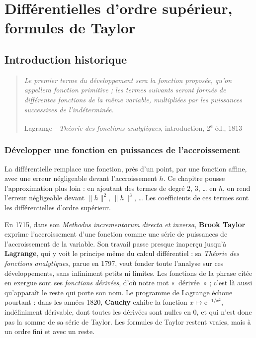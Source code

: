 \documentclass[a4paper,twoside]{report}
\newcommand{\ee}{\mathrm{e}}                      %
\newcommand{\norme}[1]{\lVert #1 \rVert}         %
\begin{document}
\setcounter{chapter}{3}

\chapter[Ordre supérieur, Taylor]{Différentielles d'ordre supérieur, formules de Taylor}

\section{Introduction historique}

\begin{quote}
\emph{Le premier terme du développement sera la fonction proposée, qu'on appellera fonction primitive ; les termes suivants seront formés de différentes fonctions de la même variable, multipliées par les puissances successives de l'indéterminée.}
\begin{flushright}Lagrange - \emph{Théorie des fonctions analytiques}, introduction, 2\textsuperscript{e} éd., 1813\end{flushright}
\end{quote}

\subsection{Développer une fonction en puissances de l'accroissement}

La différentielle remplace une fonction, près d'un point, par une fonction affine, avec une erreur négligeable devant l'accroissement $h$. Ce chapitre pousse l'approximation plus loin : en ajoutant des termes de degré $2$, $3$, \dots{} en $h$, on rend l'erreur négligeable devant $\norme{h}^{2}$, $\norme{h}^{3}$, \dots{} Les coefficients de ces termes sont les différentielles d'ordre supérieur.

En 1715, dans son \emph{Methodus incrementorum directa et inversa}, \textbf{Brook Taylor} exprime l'accroissement d'une fonction comme une série de puissances de l'accroissement de la variable. Son travail passe presque inaperçu jusqu'à \textbf{Lagrange}, qui y voit le principe même du calcul différentiel : sa \emph{Théorie des fonctions analytiques}, parue en 1797, veut fonder toute l'analyse sur ces développements, sans infiniment petits ni limites. Les fonctions de la phrase citée en exergue sont ses \emph{fonctions dérivées}, d'où notre mot «~dérivée~» ; c'est là aussi qu'apparaît le reste qui porte son nom. Le programme de Lagrange échoue pourtant : dans les années 1820, \textbf{Cauchy} exhibe la fonction $x \mapsto \ee^{-1/x^{2}}$, indéfiniment dérivable, dont toutes les dérivées sont nulles en $0$, et qui n'est donc pas la somme de sa série de Taylor. Les formules de Taylor restent vraies, mais à un ordre fini et avec un reste.
\end{document}
